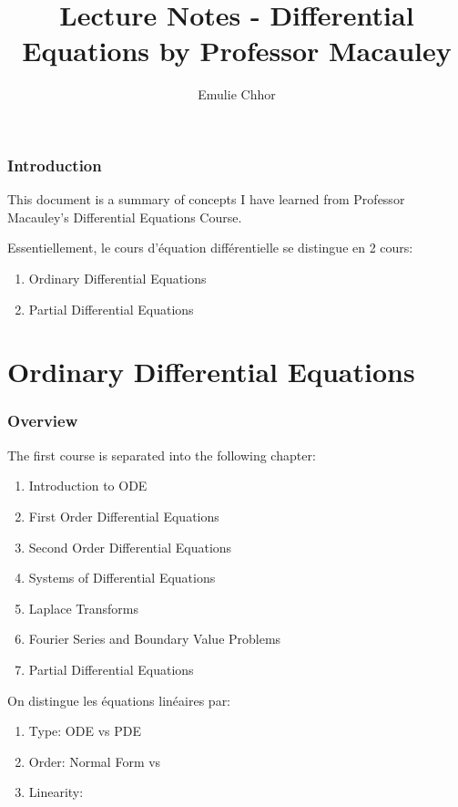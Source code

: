 \documentclass{article}
\begin{document}
\title{Lecture Notes - Differential Equations by Professor Macauley}
\author{Emulie Chhor}
\maketitle

\section*{Introduction}

This document is a summary of concepts I have learned from Professor
Macauley's Differential Equations Course.

Essentiellement, le cours d'équation différentielle se distingue
en 2 cours:
\begin{enumerate}
    \item Ordinary Differential Equations
    \item Partial Differential Equations
\end{enumerate}

\pagebreak

\part{Ordinary Differential Equations} %
\label{prt:Differential Equations}

\section{Overview}%
\label{sec:Overview}


The first course is separated into the following chapter:
\begin{enumerate}
    \item Introduction to ODE
    \item First Order Differential Equations
    \item Second Order Differential Equations
    \item Systems of Differential Equations
    \item Laplace Transforms
    \item Fourier Series and Boundary Value Problems
    \item Partial Differential Equations
\end{enumerate}

On distingue les équations linéaires par:
\begin{enumerate}
    \item Type: ODE vs PDE
    \item Order: Normal Form vs
    \item Linearity:
\end{enumerate}
\end{document}
